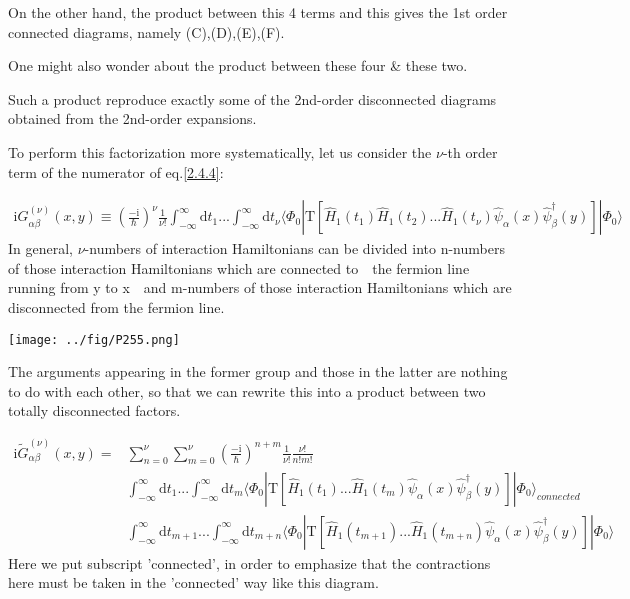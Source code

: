 On the other hand, the product between this 4 terms and this gives the 1st order connected diagrams, namely (C),(D),(E),(F).

One might also wonder about the product between these four \& these two.

Such a product reproduce exactly some of the 2nd-order disconnected diagrams obtained from the 2nd-order expansions.

To perform this factorization more systematically, let us consider the $\nu$-th order term of the numerator of eq.\eqref{2.4.4}:

\begin{align}
\mathrm{i}G_{\alpha\beta}^{(\nu)}(x,y)\equiv(\frac{-\mathrm{i}}{\hbar})^{\nu}\frac{1}{\nu!}\int_{-\infty}^{\infty}\mathrm{d}t_1...\int_{-\infty}^{\infty}\mathrm{d}t_{\nu}\langle\Phi_0|\mathrm{T}[\hat H_1(t_1)\hat H_1(t_2)...\hat H_1(t_{\nu})\hat \psi_{\alpha}(x)\hat \psi^{\dagger}_{\beta}(y)]|\Phi_0\rangle \nonumber
\end{align}
In general, $\nu$-numbers of interaction Hamiltonians can be divided into n-numbers of those interaction Hamiltonians which are connected to\ \ the fermion line running from y to x\ \ and m-numbers of those interaction Hamiltonians which are disconnected from the fermion line.
\begin{center}
\texttt{[image: ../fig/P255.png]}
\end{center}
The arguments appearing in the former group and those in the latter are nothing to do with each other, so that we can rewrite this into a product between two totally disconnected factors.

\begin{align}
\mathrm{i}\tilde{G}_{\alpha\beta}^{(\nu)}(x,y)=& \sum_{n=0}^{\nu}\sum_{m=0}^{\nu}(\frac{-\mathrm{i}}{\hbar})^{n+m}\frac{1}{\nu!}\frac{\nu!}{n!m!} \nonumber \\
&\int_{-\infty}^{\infty}\mathrm{d}t_1...\int_{-\infty}^{\infty}\mathrm{d}t_{m}\langle\Phi_0|\mathrm{T}[\hat H_1(t_1)...\hat H_1(t_{m})\hat \psi_{\alpha}(x)\hat \psi^{\dagger}_{\beta}(y)]|\Phi_0\rangle_{connected} \nonumber \\
&\int_{-\infty}^{\infty}\mathrm{d}t_{m+1}...\int_{-\infty}^{\infty}\mathrm{d}t_{m+n}\langle\Phi_0|\mathrm{T}[\hat H_1(t_{m+1})...\hat H_1(t_{m+n})\hat \psi_{\alpha}(x)\hat \psi^{\dagger}_{\beta}(y)]|\Phi_0\rangle \nonumber 
\end{align}
Here we put subscript 'connected', in order to emphasize that the contractions here must be taken in the 'connected' way like this diagram.

